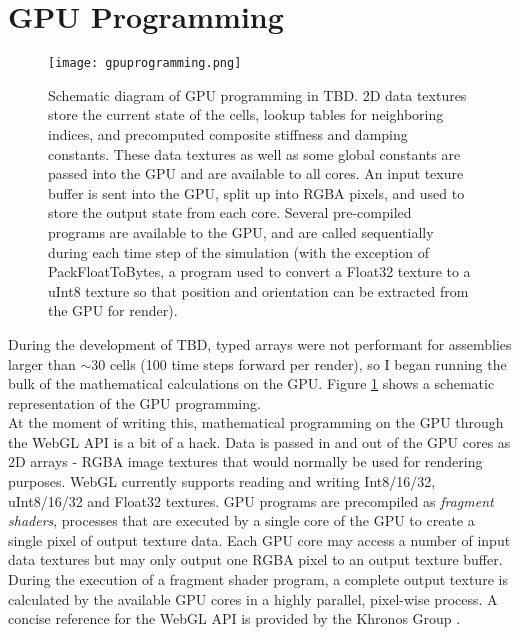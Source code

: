 {\section{GPU Programming}


\begin{figure}
  \texttt{[image: gpuprogramming.png]}
  \caption{Schematic diagram of GPU programming in TBD.  2D data textures store the current state of the cells, lookup tables for neighboring indices, and precomputed composite stiffness and damping constants.  These data textures as well as some global constants are passed into the GPU and are available to all cores.  An input texure buffer is sent into the GPU, split up into RGBA pixels, and used to store the output state from each core.  Several pre-compiled programs are available to the GPU, and are called sequentially during each time step of the simulation (with the exception of PackFloatToBytes, a program used to convert a Float32 texture to a uInt8 texture so that position and orientation can be extracted from the GPU for render).}
  \label{fig:gpuprogramming}
\end{figure}

During the development of TBD, typed arrays \cite{Network} were not performant for assemblies larger than $\sim$30 cells (100 time steps forward per render), so I began running the bulk of the mathematical calculations on the GPU.  Figure \ref{fig:gpuprogramming} shows a schematic representation of the GPU programming.\\

At the moment of writing this, mathematical programming on the GPU through the WebGL API is a bit of a hack.  Data is passed in and out of the GPU cores as 2D arrays - RGBA image textures that would normally be used for rendering purposes.  WebGL currently supports reading and writing Int8/16/32, uInt8/16/32 and Float32 textures.  GPU programs are precompiled as \textit{fragment shaders}, processes that are executed by a single core of the GPU to create a single pixel of output texture data.  Each GPU core may access a number of input data textures but may only output one RGBA pixel to an output texture buffer.  During the execution of a fragment shader program, a complete output texture is calculated by the available GPU cores in a highly parallel, pixel-wise process.  A concise reference for the WebGL API is provided by the Khronos Group \cite{Group}.\\

}
